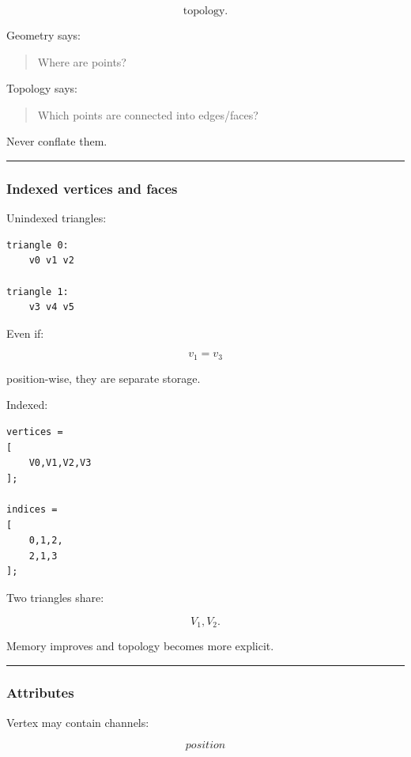 \[
\boxed{
\text{topology}.
}
\]

Geometry says:

\begin{quote}
Where are points?
\end{quote}

Topology says:

\begin{quote}
Which points are connected into edges/faces?
\end{quote}

Never conflate them.

\begin{center}\rule{0.5\linewidth}{0.5pt}\end{center}

\subsubsection{Indexed vertices and faces}\label{indexed-vertices-and-faces}

Unindexed triangles:

\begin{verbatim}
triangle 0:
    v0 v1 v2

triangle 1:
    v3 v4 v5
\end{verbatim}

Even if:

\[
v_1=v_3
\]

position-wise, they are separate storage.

Indexed:

\begin{verbatim}
vertices =
[
    V0,V1,V2,V3
];

indices =
[
    0,1,2,
    2,1,3
];
\end{verbatim}

Two triangles share:

\[
V_1,V_2.
\]

Memory improves and topology becomes more explicit.

\begin{center}\rule{0.5\linewidth}{0.5pt}\end{center}

\subsubsection{Attributes}\label{attributes}

Vertex may contain channels:

\[
position
\]

